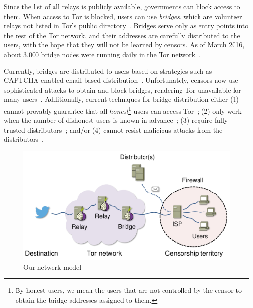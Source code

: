 \documentclass[letterpaper,twocolumn,10pt]{article}
\begin{document}

Since the list of all relays is publicly available, governments can block access to them. %
When access to Tor is blocked, users can use \emph{bridges}, which are volunteer relays not listed in Tor's public directory~\cite{Dingledine06designof}. Bridges serve only as entry points into the rest of the Tor network, and their addresses are carefully distributed to the users, with the hope that they will not be learned by censors. 
As of March 2016, about 3,000 bridge nodes were running daily in the Tor network~\cite{Tor:Bridges}.

Currently, bridges are distributed to users based on strategies such as CAPTCHA-enabled email-based distribution~\cite{Dingledine06designof}. Unfortunately, censors now use sophisticated attacks to obtain
and block bridges, rendering Tor unavailable for many users~\cite{Dingledine:Bridges:2011,Ling:2012:infocom,BridgeBlockingChina:2012}.
Additionally, current techniques for bridge distribution either (1) cannot provably guarantee that all \emph{honest}\footnote{By honest users, we mean the users that are not controlled by the censor to obtain the bridge addresses assigned to them.} users can access Tor~\cite{WangLBH:rBridge:13,McCoy:FC:2011,Sovran:2008:PSN}; (2) only work when the number of dishonest users is known in advance~\cite{Mahdian:2010}; (3) require fully trusted distributors~\cite{McCoy:FC:2011,Mahdian:2010,Sovran:2008:PSN}; and/or (4) cannot resist malicious attacks from the distributors~\cite{WangLBH:rBridge:13,McCoy:FC:2011,Mahdian:2010,Sovran:2008:PSN}.

\begin{figure}
	\centering
	\includegraphics[width=0.95\linewidth]{images/model.pdf}
	\caption{Our network model}
	\label{fig:model}
\end{figure}
\end{document}
